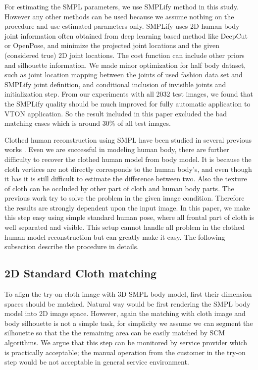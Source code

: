 For estimating the SMPL parameters, we use SMPLify\cite{Bogo2016SMPLify} method in this study. However any other methods can be used because we assume nothing on the procedure and use estimated parameters only. SMPLify uses 2D human body joint information often obtained from deep learning based method like DeepCut or OpenPose, and minimize the projected joint locations and the given (considered true) 2D joint locations. The cost function can include other priors and silhouette information. We made minor optimization for half body dataset, such as joint location mapping between the joints of used fashion data set and SMPLify joint definition, and conditional inclusion of invisible joints and initialization step.  From our experiments with all 2032 test images, we found that the SMPLify quality should be much improved for fully automatic application to VTON application. So the result included in this paper excluded the bad matching cases which is around 30\% of all test images.    
  
Clothed human reconstruction using SMPL have been studied in several previous works \cite{Weng2018PhotoW3,Zanfir2018HumanAT}.
Even we are successful in modeling human body, there are further difficulty to recover the clothed human model from body model. It is because the cloth vertices are not directly corresponds to the human body's, and even though it has it is still difficult to estimate the difference between two. Also the texture of cloth can be occluded by other part of cloth and human body parts. The previous work try to solve the problem in the given image condition. Therefore the results are strongly dependent upon the input image.
In this paper, we make this step easy using simple standard human pose, where all frontal part of cloth is well separated and visible. This setup cannot handle all problem in the clothed human model reconstruction but can greatly make it easy.   
The following subsection describe the procedure in details.



\subsection{2D Standard Cloth matching}


To align the try-on cloth image with 3D SMPL body model\cite{Loper2015SMPLAS}, first their dimension spaces should be matched. Natural way would be first rendering the SMPL body model into 2D image space. However, again the matching with cloth image and body silhouette is not a simple task, for simplicity we assume we can segment the silhouette so that the the remaining area can be easily matched by SCM algorithms. We argue that this step can be monitored by service provider which is practically acceptable; the manual operation from the customer in the try-on step would be not acceptable in general service environment.   

